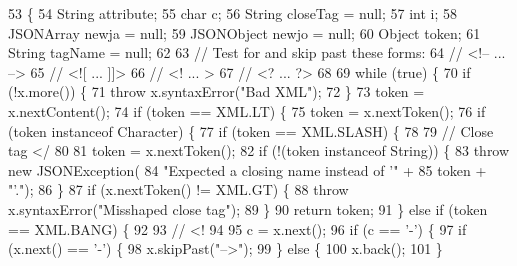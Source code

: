 \begin{DoxyCode}
53                            \{
54         String     attribute;
55         \textcolor{keywordtype}{char}       c;
56         String       closeTag = null;
57         \textcolor{keywordtype}{int}        i;
58         JSONArray  newja = null;
59         JSONObject newjo = null;
60         Object     token;
61         String       tagName = null;
62 
63 \textcolor{comment}{// Test for and skip past these forms:}
64 \textcolor{comment}{//      <!-- ... -->}
65 \textcolor{comment}{//      <![  ... ]]>}
66 \textcolor{comment}{//      <!   ...   >}
67 \textcolor{comment}{//      <?   ...  ?>}
68 
69         \textcolor{keywordflow}{while} (\textcolor{keyword}{true}) \{
70             \textcolor{keywordflow}{if} (!x.more()) \{
71                 \textcolor{keywordflow}{throw} x.syntaxError(\textcolor{stringliteral}{"Bad XML"});
72             \}
73             token = x.nextContent();
74             \textcolor{keywordflow}{if} (token == XML.LT) \{
75                 token = x.nextToken();
76                 \textcolor{keywordflow}{if} (token instanceof Character) \{
77                     \textcolor{keywordflow}{if} (token == XML.SLASH) \{
78 
79 \textcolor{comment}{// Close tag </}
80 
81                         token = x.nextToken();
82                         \textcolor{keywordflow}{if} (!(token instanceof String)) \{
83                             \textcolor{keywordflow}{throw} \textcolor{keyword}{new} JSONException(
84                                     \textcolor{stringliteral}{"Expected a closing name instead of '"} +
85                                     token + \textcolor{stringliteral}{"'."});
86                         \}
87                         \textcolor{keywordflow}{if} (x.nextToken() != XML.GT) \{
88                             \textcolor{keywordflow}{throw} x.syntaxError(\textcolor{stringliteral}{"Misshaped close tag"});
89                         \}
90                         \textcolor{keywordflow}{return} token;
91                     \} \textcolor{keywordflow}{else} \textcolor{keywordflow}{if} (token == XML.BANG) \{
92 
93 \textcolor{comment}{// <!}
94 
95                         c = x.next();
96                         \textcolor{keywordflow}{if} (c == \textcolor{charliteral}{'-'}) \{
97                             \textcolor{keywordflow}{if} (x.next() == \textcolor{charliteral}{'-'}) \{
98                                 x.skipPast(\textcolor{stringliteral}{"-->"});
99                             \} \textcolor{keywordflow}{else} \{
100                                 x.back();
101                             \}

\end{DoxyCode}
